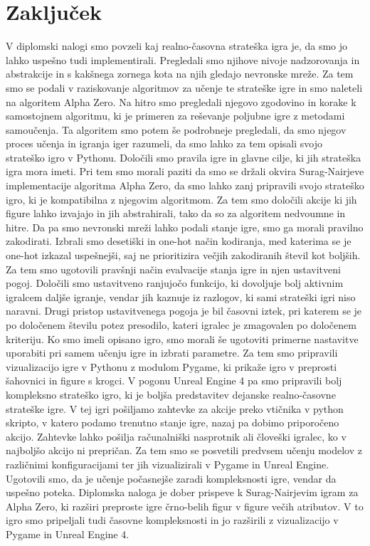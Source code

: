\documentclass[a4paper, 12pt]{book}
\begin{document}
\chapter{Zaključek}
\label{chzakljucek}
V diplomski nalogi smo povzeli kaj realno-časovna strateška igra je, da smo jo lahko uspešno tudi implementirali.
Pregledali smo njihove nivoje nadzorovanja in abstrakcije in s kakšnega zornega kota na njih gledajo nevronske mreže.
Za tem smo se podali v raziskovanje algoritmov za učenje te strateške igre in smo naleteli na algoritem Alpha Zero.
Na hitro smo pregledali njegovo zgodovino in korake k samostojnem algoritmu, ki je primeren za reševanje poljubne igre z metodami samoučenja.
Ta algoritem smo potem še podrobneje pregledali, da smo njegov proces učenja in igranja iger razumeli, da smo lahko za tem opisali svojo strateško igro v Pythonu.
Določili smo pravila igre in glavne cilje, ki jih strateška igra mora imeti.
Pri tem smo morali paziti da smo se držali okvira Surag-Nairjeve implementacije algoritma Alpha Zero, da smo lahko zanj pripravili svojo strateško igro, ki je kompatibilna z njegovim algoritmom.
Za tem smo določili akcije ki jih figure lahko izvajajo in jih abstrahirali, tako da so za algoritem nedvoumne in hitre.
Da pa smo nevronski mreži lahko podali stanje igre, smo ga morali pravilno zakodirati.
Izbrali smo desetiški in one-hot način kodiranja, med katerima se je one-hot izkazal uspešnejši, saj ne prioritizira večjih zakodiranih števil kot boljših.
Za tem smo ugotovili pravšnji način evalvacije stanja igre in njen ustavitveni pogoj.
Določili smo ustavitveno ranjujočo funkcijo, ki dovoljuje bolj aktivnim igralcem daljše igranje, vendar jih kaznuje iz razlogov, ki sami strateški igri niso naravni.
Drugi pristop ustavitvenega pogoja je bil časovni iztek, pri katerem se je po določenem številu potez presodilo, kateri igralec je zmagovalen po določenem kriteriju.
Ko smo imeli opisano igro, smo morali še ugotoviti primerne nastavitve uporabiti pri samem učenju igre in izbrati parametre.
Za tem smo pripravili vizualizacijo igre v Pythonu z modulom Pygame, ki prikaže igro v preprosti šahovnici in figure s krogci.
V pogonu Unreal Engine 4 pa smo pripravili bolj kompleksno strateško igro, ki je boljša predstavitev dejanske realno-časovne strateške igre.
V tej igri pošiljamo zahtevke za akcije preko vtičnika v python skripto, v katero podamo trenutno stanje igre, nazaj pa dobimo priporočeno akcijo.
Zahtevke lahko pošilja r\textsl{}ačunalniški nasprotnik ali človeški igralec, ko v najboljšo akcijo ni prepričan.
Za tem smo se posvetili predvsem učenju modelov z različnimi konfiguracijami ter jih vizualizirali v Pygame in Unreal Engine.
Ugotovili smo, da je učenje počasnejše zaradi kompleksnosti igre, vendar da uspešno poteka.
Diplomska naloga je dober prispeve k Surag-Nairjevim igram za Alpha Zero, ki razširi preproste igre črno-belih figur v figure večih atributov.
V to igro smo pripeljali tudi časovne kompleksnosti in jo razširili z vizualizacijo v Pygame in Unreal Engine 4.
\end{document}
